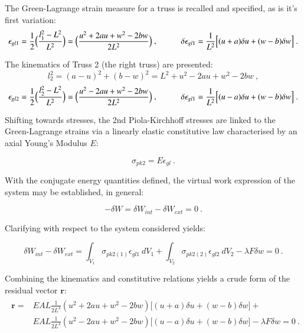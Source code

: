 The Green-Lagrange strain measure for a truss is recalled and specified, as is it's first variation:
\begin{equation} 
\epsilon_{gl1} = \frac{1}{2}
\Big(\frac{l_1^2-L^2}{L^2}\Big)
=
\Big(\frac{u^2 + 2au +w^2 -2bw}{2L^2}\Big)\ ,
\hspace{10mm}
\delta\epsilon_{gl1} = 
\frac{1}{L^2}
\Big[
(u+a)\delta u
+
(w-b)\delta w
\Big]
\label{eqapp0_2}\ .
\end{equation}

The kinematics of Truss 2 (the right truss) are presented:
\begin{equation} 
l_2^2 = (a-u)^2 + (b-w)^2 = L^2 + u^2 - 2au +w^2 -2bw
\label{eqapp0_2_1}\ ,
\end{equation}
\begin{equation} 
\epsilon_{gl2} = \frac{1}{2}
\Big(\frac{l_2^2-L^2}{L^2}\Big)
=
\Big(\frac{u^2 - 2au +w^2 -2bw}{2L^2}\Big)\ ,
\hspace{10mm}
\delta\epsilon_{gl1} = 
\frac{1}{L^2}
\Big[
(u-a)\delta u
+
(w-b)\delta w
\Big]
\label{eqapp0_2_2}\ .
\end{equation}

Shifting towards stresses, the 2nd Piola-Kirchhoff stresses are linked to the Green-Lagrange strains via a linearly elastic constitutive law characterised by an axial Young's Modulus $E$:

\begin{equation} 
\sigma_{pk2} = E \epsilon_{gl}
\label{eqapp0_3}\ .
\end{equation}

With the conjugate energy quantities defined, the virtual work expression of the system may be established, in general:

\begin{equation} 
-\delta W = \delta W_{int} - \delta W_{ext} = 0
\label{eqapp0_4}\ .
\end{equation}

Clarifying with respect to the system considered yields:

\begin{equation} 
\delta W_{int} - \delta W_{ext} = 
\int_{V_1} \sigma_{pk2(1)} \epsilon_{gl1}
\ dV_1
+
\int_{V_2} \sigma_{pk2(2)} \epsilon_{gl2}
\ dV_2
- \lambda F \delta w = 0
\label{eqapp0_5}\ .
\end{equation}

Combining the kinematics and constitutive relations yields a crude form of the residual vector $\mathbf{r}$:
\begin{gather} 
	\begin{aligned}
		\mathbf{r} = 
		&EAL
		\frac{1}{2L^4}
		(u^2 + 2au +w^2 -2bw)
		\Big[
		(u+a)\delta u
		+
		(w-b)\delta w
		\Big] +
		\\
		&EAL
		\frac{1}{2L^4}
		(u^2 - 2au +w^2 -2bw)
		\Big[
		(u-a)\delta u
		+
		(w-b)\delta w
		\Big] 
		- \lambda F \delta w = 0
		\label{eqapp0_6_0}\ .
	\end{aligned}
\end{gather}

